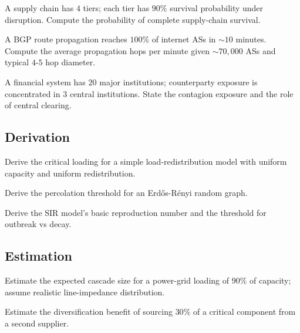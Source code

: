 \begin{exercise}
A supply chain has $4$ tiers; each tier has $90\%$ survival probability under disruption. Compute the probability of complete supply-chain survival.
\end{exercise}

\begin{exercise}
A BGP route propagation reaches $100\%$ of internet ASs in $\sim 10$ minutes. Compute the average propagation hops per minute given $\sim 70{,}000$ ASs and typical $4$-$5$ hop diameter.
\end{exercise}

\begin{exercise}
A financial system has $20$ major institutions; counterparty exposure is concentrated in $3$ central institutions. State the contagion exposure and the role of central clearing.
\end{exercise}

\subsection*{Derivation}

\begin{exercise}
Derive the critical loading for a simple load-redistribution model with uniform capacity and uniform redistribution.
\end{exercise}

\begin{exercise}
Derive the percolation threshold for an Erd\H{o}s-R\'enyi random graph.
\end{exercise}

\begin{exercise}
Derive the SIR model's basic reproduction number and the threshold for outbreak vs decay.
\end{exercise}

\subsection*{Estimation}

\begin{exercise}
Estimate the expected cascade size for a power-grid loading of $90\%$ of capacity; assume realistic line-impedance distribution.
\end{exercise}

\begin{exercise}
Estimate the diversification benefit of sourcing $30\%$ of a critical component from a second supplier.
\end{exercise}

